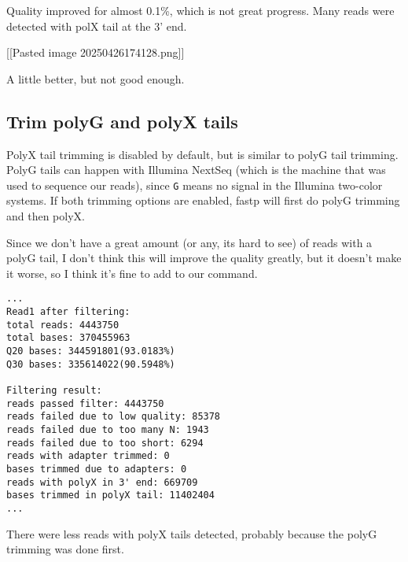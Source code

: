 Quality improved for almost 0.1\%, which is not great progress. Many
reads were detected with polX tail at the 3' end.

{[}{[}Pasted image 20250426174128.png{]}{]}

A little better, but not good enough.

\hypertarget{trim-polyg-and-polyx-tails}{%
\subsection{Trim polyG and polyX
tails}\label{trim-polyg-and-polyx-tails}}

PolyX tail trimming is disabled by default, but is similar to polyG tail
trimming. PolyG tails can happen with Illumina NextSeq (which is the
machine that was used to sequence our reads), since \texttt{G} means no
signal in the Illumina two-color systems. If both trimming options are
enabled, fastp will first do polyG trimming and then polyX.

Since we don't have a great amount (or any, its hard to see) of reads
with a polyG tail, I don't think this will improve the quality greatly,
but it doesn't make it worse, so I think it's fine to add to our
command.

\begin{Shaded}
\begin{Highlighting}[]
\end{Highlighting}
\end{Shaded}

\begin{verbatim}
...
Read1 after filtering:
total reads: 4443750
total bases: 370455963
Q20 bases: 344591801(93.0183%)
Q30 bases: 335614022(90.5948%)

Filtering result:
reads passed filter: 4443750
reads failed due to low quality: 85378
reads failed due to too many N: 1943
reads failed due to too short: 6294
reads with adapter trimmed: 0
bases trimmed due to adapters: 0
reads with polyX in 3' end: 669709
bases trimmed in polyX tail: 11402404
...
\end{verbatim}

There were less reads with polyX tails detected, probably because the
polyG trimming was done first.

